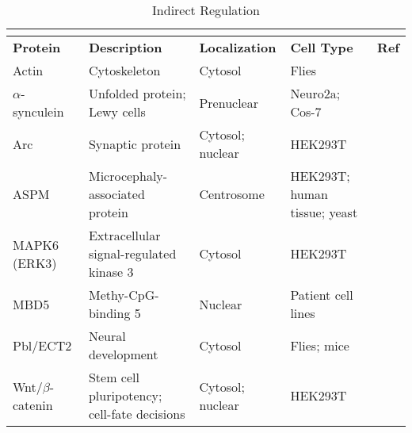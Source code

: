 \pagebreak

\begin{longtabu} to \textwidth {X[1,l]X[1.2,l]X[1,l]X[1,l]X[0.4,c]}
  \caption{Indirect Regulation}\\
  \label{table:a-3}\\
  \toprule
  \textbf{Protein} & \textbf{Description} & \textbf{Localization} & \textbf{Cell Type} & \textbf{Ref}\\
  \midrule
  \endhead
  Actin              & Cytoskeleton                    & Cytosol          & Flies                        & \cite{Jensen2013}\\
  $\alpha$-synculein & Unfolded protein; Lewy cells    & Prenuclear       & Neuro2a; Cos-7               & \cite{Mulherkar2009}\\
  Arc                & Synaptic protein                & Cytosol; nuclear & HEK293T                      & \cite{Kuhnle2013}\\
  ASPM               & Microcephaly-associated protein & Centrosome       & HEK293T; human tissue; yeast & \cite{Singhmar2011}\\
  MAPK6 (ERK3)       & Extracellular signal-regulated kinase 3 & Cytosol  & HEK293T                      & \cite{Martinez-Noel2012}\\
  MBD5               & Methy-CpG-binding 5             & Nuclear          & Patient cell lines           & \cite{Mullegama2015}\\
  Pbl/ECT2           & Neural development              & Cytosol          & Flies; mice                  & \cite{Reiter2006}\\
  Wnt/$\beta$-catenin & Stem cell pluripotency; cell-fate decisions & Cytosol; nuclear & HEK293T         & \cite{Sominsky2014}\\
  \bottomrule
\end{longtabu}

\pagebreak

